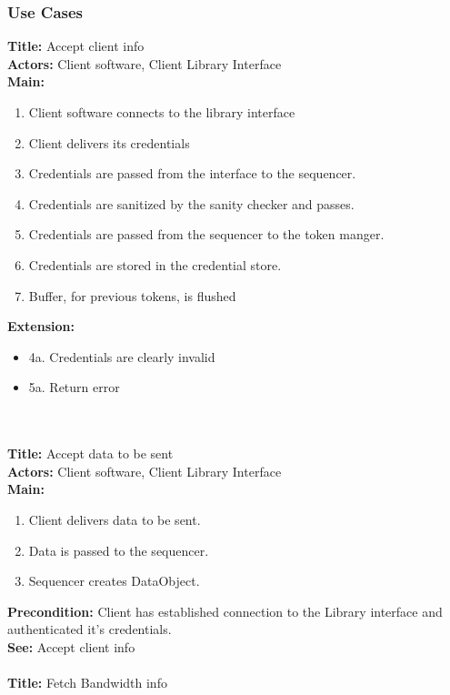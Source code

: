 	\subsubsection{Use Cases}\label{client use cases}
		\textbf{Title:} Accept client info \\
		\textbf{Actors:} Client software, Client Library Interface \\
		\textbf{Main:}
		\begin{enumerate}
			\item Client software connects to the library interface
			\item Client delivers its credentials
			\item Credentials are passed from the interface to the sequencer.
			\item Credentials are sanitized by the sanity checker and passes.
			\item Credentials are passed from the sequencer to the token manger.
			\item Credentials are stored in the credential store.
			\item Buffer, for previous tokens, is flushed
		\end{enumerate}
		\textbf{Extension:} 
		\begin{itemize}
			  \item[] 4a. Credentials are clearly invalid
			  \item[] 5a. Return error
		\end{itemize}
		\\\\
		\textbf{Title:} Accept data to be sent \\
		\textbf{Actors:} Client software, Client Library Interface \\
		\textbf{Main:}
		\begin{enumerate}
			\item Client delivers data to be sent.
			\item Data is passed to the sequencer.
			\item Sequencer creates DataObject.
		\end{enumerate}
		\textbf{Precondition:} Client has established connection to the Library interface and authenticated it's credentials. \\
		\textbf{See:} Accept client info
		\\\\
		\textbf{Title:} Fetch Bandwidth info \\
